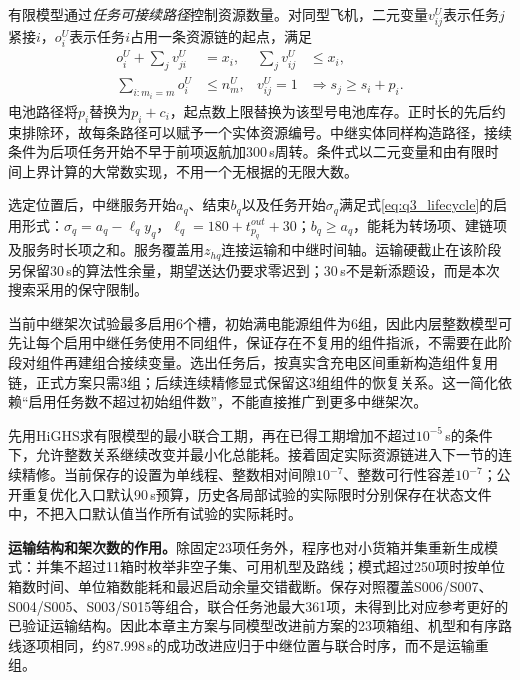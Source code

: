 \documentclass[withoutpreface,colorprint]{format}
\numberwithin{equation}{section}
\numberwithin{figure}{section}
\numberwithin{table}{section}
\begin{document}
有限模型通过\emph{任务可接续路径}控制资源数量。对同型飞机，二元变量$v^U_{ij}$表示任务$j$紧接$i$，$o_i^U$表示任务$i$占用一条资源链的起点，满足
\begin{equation}
\begin{aligned}
 o_i^U+\sum_jv^U_{ji}&=x_i,&\sum_jv^U_{ij}&\le x_i,\\
 \sum_{i:m_i=m}o_i^U&\le n_m^U,&
 v^U_{ij}=1&\Rightarrow s_j\ge s_i+p_i .
\end{aligned}
\label{eq:q3_transport_paths}
\end{equation}
电池路径将$p_i$替换为$p_i+c_i$，起点数上限替换为该型号电池库存。正时长的先后约束排除环，故每条路径可以赋予一个实体资源编号。中继实体同样构造路径，接续条件为后项任务开始不早于前项返航加300\,s周转。条件式以二元变量和由有限时间上界计算的大常数实现，不用一个无根据的无限大数。

选定位置后，中继服务开始$a_q$、结束$b_q$以及任务开始$\sigma_q$满足式\eqref{eq:q3_lifecycle}的启用形式：$\sigma_q=a_q-\ell_qy_q$，$\ell_q=180+t^{out}_{p_q}+30$；$b_q\ge a_q$，能耗为转场项、建链项及服务时长项之和。服务覆盖用$z_{hq}$连接运输和中继时间轴。运输硬截止在该阶段另保留30\,s的算法性余量，期望送达仍要求零迟到；30\,s不是新添题设，而是本次搜索采用的保守限制。

当前中继架次试验最多启用6个槽，初始满电能源组件为6组，因此内层整数模型可先让每个启用中继任务使用不同组件，保证存在不复用的组件指派，不需要在此阶段对组件再建组合接续变量。选出任务后，按真实含充电区间重新构造组件复用链，正式方案只需3组；后续连续精修显式保留这3组组件的恢复关系。这一简化依赖“启用任务数不超过初始组件数”，不能直接推广到更多中继架次。

先用HiGHS求有限模型的最小联合工期，再在已得工期增加不超过$10^{-5}$\,s的条件下，允许整数关系继续改变并最小化总能耗。接着固定实际资源链进入下一节的连续精修。当前保存的设置为单线程、整数相对间隙$10^{-7}$、整数可行性容差$10^{-7}$；公开重复优化入口默认90\,s预算，历史各局部试验的实际限时分别保存在状态文件中，不把入口默认值当作所有试验的实际耗时。

\textbf{运输结构和架次数的作用。}除固定23项任务外，程序也对小货箱并集重新生成模式：并集不超过11箱时枚举非空子集、可用机型及路线；模式超过250项时按单位箱数时间、单位箱数能耗和最迟启动余量交错截断。保存对照覆盖S006/S007、S004/S005、S003/S015等组合，联合任务池最大361项，未得到比对应参考更好的已验证运输结构。因此本章主方案与同模型改进前方案的23项箱组、机型和有序路线逐项相同，约87.998\,s的成功改进应归于中继位置与联合时序，而不是运输重组。
\end{document}
